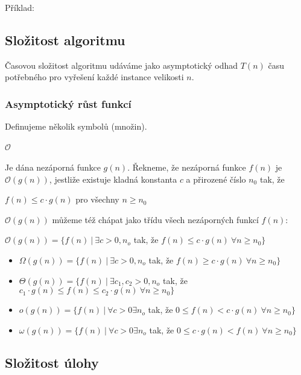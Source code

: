 Příklad:

\subsection*{Složitost algoritmu}
Časovou složitost algoritmu udáváme jako asymptotický odhad $T(n)$ času potřebného pro vyřešení každé instance velikosti $n$.

\subsubsection*{Asymptotický růst funkcí} Definujeme několik symbolů (množin).

\paragraph{$\mathcal{O}$} Je dána nezáporná funkce $g(n)$. Řekneme, že nezáporná funkce $f(n)$ je $\mathcal{O}(g(n))$, jestliže existuje kladná konstanta $c$ a přirozené číslo $n_0$ tak, že

\begin{center}
    $f(n) \leq c \cdot g(n)$ pro všechny $n \geq n_0$
\end{center}

$\mathcal{O}(g(n))$ můžeme též chápat jako třídu všech nezáporných funkcí $f(n)$:

\begin{center}
    $\mathcal{O}(g(n)) = \{ f(n)~|~\exists c > 0, n_o$ tak, že $f(n) \leq c \cdot g(n) ~ \forall n \geq n_0\}$
\end{center}

\begin{itemize}[itemsep=0pt]
    \item $\Omega(g(n)) = \{ f(n)~|~\exists c > 0 ,n_o$ tak, že $f(n) \geq c \cdot g(n) ~ \forall n \geq n_0\}$
    \item $\Theta(g(n)) = \{ f(n)~|~\exists c_1,c_2 > 0 ,n_o$ tak, že $c_1 \cdot g(n) \leq f(n) \leq c_2 \cdot g(n) ~ \forall n \geq n_0\}$
    \item $o(g(n)) = \{ f(n)~|~\forall c > 0 \exists n_o$ tak, že $ 0 \leq f(n) < c \cdot g(n) ~ \forall n \geq n_0\}$
    \item $\omega(g(n)) = \{ f(n)~|~\forall c > 0 \exists n_o$ tak, že $ 0 \leq c \cdot g(n) < f(n) ~ \forall n \geq n_0\}$
\end{itemize}

\subsection*{Složitost úlohy}


